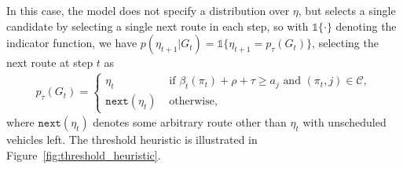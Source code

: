 \documentclass[a4paper]{article}
\theoremstyle{definition}
\theoremstyle{plain}
\begin{document}
In this case, the model does not specify a distribution over $\eta$, but selects
a single candidate by selecting a single next route in each step, so with
$\mathds{1}\{ \cdot \}$ denoting the indicator function, we have
$p(\eta_{t+1} | G_{t}) = \mathds{1}\{ \eta_{t+1} = p_{\tau}(G_{t}) \}$,
selecting the next route at step $t$ as
\begin{align*}
  p_{\tau}(G_{t}) = \begin{cases}
                \eta_{t} \quad &\text{ if } \beta_{t}(\pi_{t}) + \rho + \tau \geq a_{j} \text{ and } (\pi_{t},j) \in \mathcal{C} , \\
                \texttt{next}(\eta_{t}) & \text{ otherwise, }
              \end{cases}
\end{align*}
where $\texttt{next}(\eta_{t})$ denotes some arbitrary route other than $\eta_{t}$ with
unscheduled vehicles left.
%
The threshold heuristic is illustrated in Figure~\ref{fig:threshold_heuristic}.
\end{document}
